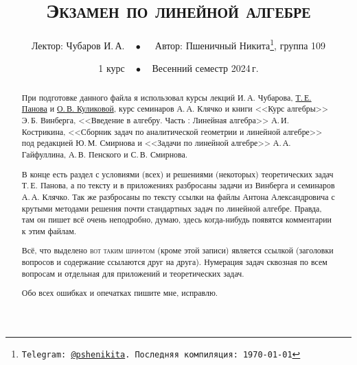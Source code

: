 \documentclass[a4paper, 11pt]{article}
\begin{document}
\let\hypercontentsline=\contentsline
\renewcommand{\contentsline}[4]{\hypertarget{toc.#4}{}\hypercontentsline{#1}{#2}{#3}{#4}}

\title{\bfseries\scshape Экзамен по линейной алгебре}
\date{1 курс$\quad\bullet\quad$Весенний семестр 2024\,г.}
\author{Лектор: Чубаров И.\,А.$\quad\bullet\quad$ Автор: Пшеничный Никита\thanks{\texttt{Telegram: \href{https://t.me/pshenikita}{@pshenikita}. Последняя компиляция: \today}}, группа 109}

\maketitle

\begin{abstract}
    При подготовке данного файла я использовал курсы лекций И.\,А. Чубарова, \href{http://higeom.math.msu.su/people/taras/#teaching}{Т.\,Е. Панова} и \href{http://halgebra.math.msu.su/wiki/lib/exe/fetch.php/28_lectures_02_06_20_.pdf}{О.\,В. Куликовой}, курс семинаров А.\,А. Клячко и книги <<Курс алгебры>> Э.\,Б. Винберга, <<Введение в алгебру. Часть : Линейная алгебра>> А.\,И. Кострикина, <<Сборник задач по аналитической геометрии и линейной алгебре>> под редакцией Ю.\,М. Смирнова и <<Задачи по линейной алгебре>> А.\,А. Гайфуллина, А.\,В. Пенского и С.\,В. Смирнова.

    В конце есть раздел с условиями (всех) и решениями (некоторых) теоретических задач Т.\,Е. Панова, а по тексту и в приложениях разбросаны задачи из Винберга и семинаров А.\,А. Клячко. Так же разбросаны по тексту ссылки на файлы Антона Александровича с крутыми методами решения почти стандартных задач по линейной алгебре. Правда, там он пишет всё очень неподробно, думаю, здесь когда-нибудь появятся комментарии к этим файлам.

    Всё, что выделено {\scshape вот таким шрифтом} (кроме этой записи) является ссылкой (заголовки вопросов и содержание ссылаются друг на друга). Нумерация задач сквозная по всем вопросам и отдельная для приложений и теоретических задач.

    Обо всех ошибках и опечатках пишите мне, исправлю.
\end{abstract}

\tableofcontents

\newpage
\end{document}
